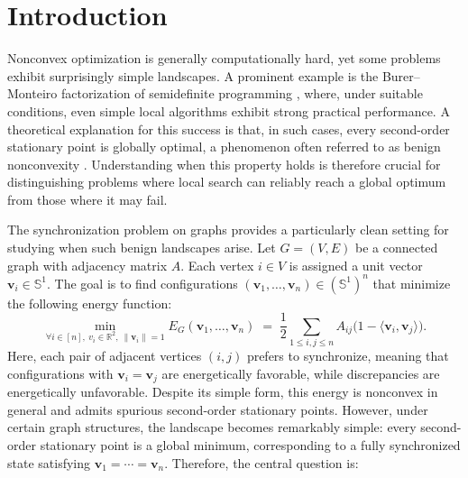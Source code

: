 \documentclass[11pt,reqno]{amsart}
\theoremstyle{definition}
\begin{document}
\section{Introduction}\label{sec:intro}
Nonconvex optimization is generally computationally hard, yet some problems exhibit surprisingly simple landscapes.
A prominent example is the Burer--Monteiro factorization of semidefinite programming \cite{burer2003nonlinear,boumal2020deterministic}, where, under suitable conditions, even simple local algorithms exhibit strong practical performance. A theoretical explanation for this success is that, in such cases, every second-order stationary point is globally optimal, a phenomenon often referred to as benign nonconvexity \cite{GeLeeMa2017,SunQuWright2018,BoumalAbsilCartis2018}. Understanding when this property holds is therefore crucial for distinguishing problems where local search can reliably reach a global optimum from those where it may fail.

The synchronization problem on graphs provides a particularly clean setting for studying when such benign landscapes arise.
Let $G=(V,E)$ be a connected graph with adjacency matrix $A$. Each vertex $i\in V$ is assigned a unit vector $\boldsymbol v_i\in\mathbb{S}^1$.
The goal is to find configurations $(\boldsymbol v_1, \ldots, \boldsymbol v_n) \in (\mathbb S^1)^n$ that minimize the following energy function:
\begin{equation}\label{E_1}
\min_{\forall i \in [n], \ v_i\in \mathbb{R}^2,\ \|\boldsymbol v_i\|=1}
E_G(\boldsymbol v_1,\ldots,\boldsymbol v_n)
\;=\;
\frac{1}{2}\sum_{1 \le i,j \le n} A_{ij} \bigl(1 - \langle\boldsymbol  v_i, \boldsymbol v_j \rangle\bigr).
\end{equation}
Here, each pair of adjacent vertices $(i,j)$ prefers to synchronize, meaning that configurations with $\boldsymbol v_i = \boldsymbol v_j$ are energetically favorable, while discrepancies are energetically unfavorable.
Despite its simple form, this energy is nonconvex in general and admits spurious second-order stationary points.
However, under certain graph structures, the landscape becomes remarkably simple: every second-order stationary point is a global minimum, corresponding to a fully synchronized state satisfying $\boldsymbol v_1=\cdots=\boldsymbol v_n$.
Therefore, the central question is:
\end{document}
